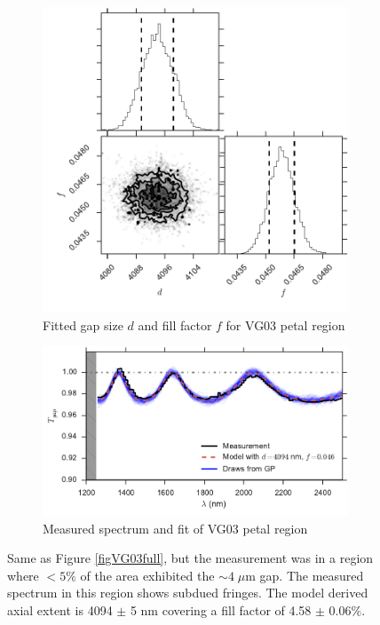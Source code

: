 \documentclass[osajnl,preprint,showpacs,superscriptaddress,12pt]{revtex4-1} %
\begin{document}
\begin{figure}[htbp]
        \centering
        \begin{subfigure}[b]{0.5\textwidth}
              \includegraphics[width=\textwidth]{figs/VG03p2_corner.pdf}
              \caption{Fitted gap size $d$ and fill factor $f$ for VG03 petal region}
		\label{figVG03p2_corner}
        \end{subfigure}

        \begin{subfigure}[b]{0.5\textwidth}
                \includegraphics[width=\textwidth]{figs/VG03_f045.pdf}
                \caption{Measured spectrum and fit of VG03 petal region}
                \label{figVG03_f045}
        \end{subfigure}
\caption{ Same as Figure \ref{figVG03full}, but the measurement was in a region where $<5\%$ of the area exhibited the $\sim4\; \mu$m gap.  The measured spectrum in this region shows subdued fringes. The model derived axial extent is 4094 $\pm$ 5 nm covering a fill factor of 4.58 $\pm$ 0.06$\%$. \label{figVG03part}}
\end{figure}
\end{document}

